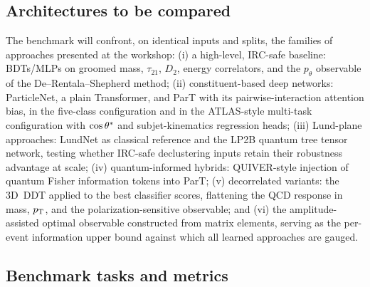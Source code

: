 \subsection{Architectures to be compared}

The benchmark will confront, on identical inputs and splits, the families of
approaches presented at the workshop:
(i) a high-level, IRC-safe baseline: BDTs/MLPs on groomed mass,
$\tau_{21}$, $D_2$, energy correlators, and the $p_\theta$ observable of the
De--Rentala--Shepherd method;
(ii) constituent-based deep networks: ParticleNet, a plain Transformer, and
ParT with its pairwise-interaction attention bias, in the five-class
configuration and in the ATLAS-style multi-task configuration with
$\cos\theta^{*}$ and subjet-kinematics regression heads;
(iii) Lund-plane approaches: LundNet as classical reference and the LP2B
quantum tree tensor network, testing whether IRC-safe declustering inputs
retain their robustness advantage at scale;
(iv) quantum-informed hybrids: QUIVER-style injection of quantum Fisher
information tokens into ParT;
(v) decorrelated variants: the 3D~DDT applied to the best classifier scores,
flattening the QCD response in mass, $p_{\mathrm{T}}$, and the polarization-sensitive
observable; and
(vi) the amplitude-assisted optimal observable constructed from matrix
elements, serving as the per-event information upper bound against which all
learned approaches are gauged.

\subsection{Benchmark tasks and metrics}

